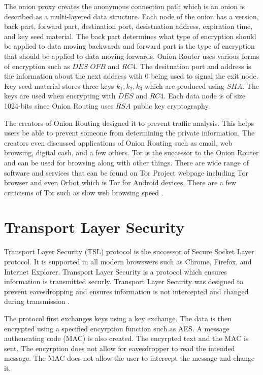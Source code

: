 \documentclass[12pt]{article}
\begin{document}
The onion proxy creates the anonymous connection path which is an onion is described as a multi-layered data structure. Each node of the onion has a version, back part, forward part, destination port, desistnation address, expiration time, and key seed material. The back part determines what type of encryption should be applied to data moving backwards and forward part is the type of encryption that should be applied to data moving forwards.  Onion Router uses various forms of encryption such as $DES$ $OFB$ and $RC4$\cite{Reed}. The desitnation port and address is the information about the next address with 0 being used to signal the exit node. Key seed material stores three keys $k_1, k_2, k_3$ which are produced using $SHA$. The keys are used when encrypting with $DES$ and $RC4$. Each data node is of size 1024-bits since Onion Routing uses $RSA$ public key cryptography.

The creators of Onion Routing designed it to prevent traffic analysis. This helps users be able to prevent someone from determining the private information. The creators even discussed applications of Onion Routing such as email, web browsing, digital cash, and a few others\cite{Reed}. Tor is the successor to the Onion Router and can be used for browsing along with other things. There are wide range of software and services that can be found on Tor Project webpage including Tor browser and even Orbot which is Tor for Android devices. There are a few criticisms of Tor such as slow web browsing speed \cite{GoldbertTwo}.

\section{Transport Layer Security}\label{sec:tls}

Transport Layer Security (TSL) protocol is the successor of Secure Socket Layer protocol. It is supported in all modern browswers such as Chrome, Firefox, and Internet Explorer. Transport Layer Security is a protocol which ensures information is transmitted securly. Transport Layer Security was designed to prevent eavesdropping and ensures information is not intercepted and changed during transmission \cite{Sidhpurwala}.

The protocol first exchanges keys using a key exchange. The data is then encrypted using a specified encyrption function such as AES. A message authencating code (MAC) is also created. The encyrpted text and the MAC is sent. The encyrption does not allow for eavesdropper to read the intended message. The MAC does not allow the user to intercept the message and change it.
\end{document}
